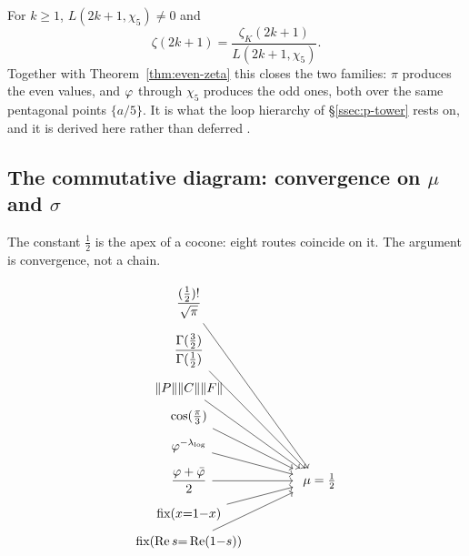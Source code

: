 \begin{theorem}\label{thm:zeta-odd}
For $k\ge1$, $L(2k+1,\chi_5)\neq0$ and
\begin{equation}\label{eq:zeta-odd}
  \zeta(2k+1)=\frac{\zeta_K(2k+1)}{L(2k+1,\chi_5)} .
\end{equation}
Together with Theorem~\ref{thm:even-zeta} this closes the two families: $\pi$ produces the even
values, and $\varphi$ through $\chi_5$ produces the odd ones, both over the same pentagonal points
$\{a/5\}$. It is what the loop hierarchy of \S\ref{ssec:p-tower} rests on, and it is derived here
rather than deferred .

\end{theorem}

\subsection{The commutative diagram: convergence on $\mu$ and
$\sigma$}\label{ssec:commute}
The constant $\tfrac12$ is the apex of a cocone: eight
routes coincide on it. The argument is convergence, not a chain.

\[
\begin{tikzcd}[row sep=tiny, column sep=large]
\dfrac{(\tfrac12)!}{\sqrt\pi} \arrow[dddddr] & \\
\dfrac{\Gamma(\tfrac32)}{\Gamma(\tfrac12)} \arrow[ddddr] & \\
\|P\|\|C\|\|F\| \arrow[dddr] & \\
\cos(\tfrac{\pi}{3}) \arrow[ddr] & \\
\golden^{-\lng} \arrow[dr] & \\
\dfrac{\golden+\bar\golden}{2} \arrow[r] & \ \mu=\tfrac12 \\
\text{fix}(x{=}1{-}x) \arrow[ur] & \\
\text{fix}(\Re s{=}\Re(1{-}s)) \arrow[uur] &
\end{tikzcd}
\]

